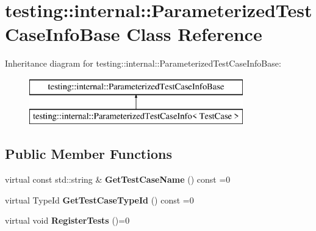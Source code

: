 \hypertarget{classtesting_1_1internal_1_1_parameterized_test_case_info_base}{}\section{testing\+:\+:internal\+:\+:Parameterized\+Test\+Case\+Info\+Base Class Reference}
\label{classtesting_1_1internal_1_1_parameterized_test_case_info_base}
Inheritance diagram for testing\+:\+:internal\+:\+:Parameterized\+Test\+Case\+Info\+Base\+:\begin{figure}[H]
\begin{center}
\leavevmode
\includegraphics[height=2.000000cm]{classtesting_1_1internal_1_1_parameterized_test_case_info_base}
\end{center}
\end{figure}
\subsection*{Public Member Functions}
\begin{DoxyCompactItemize}
\item 
\mbox{\label{classtesting_1_1internal_1_1_parameterized_test_case_info_base_ac69b3bc29debfd6d891b7f5b2d088b1c}} 
virtual const std\+::string \& {\bfseries Get\+Test\+Case\+Name} () const =0
\item 
\mbox{\label{classtesting_1_1internal_1_1_parameterized_test_case_info_base_a932b4a9185a72d5bdfa5fd84fc06cbca}} 
virtual Type\+Id {\bfseries Get\+Test\+Case\+Type\+Id} () const =0
\item 
\mbox{\label{classtesting_1_1internal_1_1_parameterized_test_case_info_base_a92baca6c64c822c2e7043217f7903ef2}} 
virtual void {\bfseries Register\+Tests} ()=0
\end{DoxyCompactItemize}
